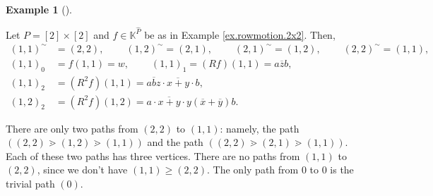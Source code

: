 \documentclass[numbers=enddot,12pt,final,onecolumn,notitlepage]{scrartcl}%
\theoremstyle{definition}
\newtheorem{exam}[theo]{Example}
\newenvironment{example}[1][]
{\begin{exam}[#1]\begin{leftbar}}
{\end{leftbar}\end{exam}}
\begin{document}
\begin{example}
Let $P=\left[  2\right]  \times\left[  2\right]  $ and $f\in\mathbb{K}%
^{\widehat{P}}$ be as in Example \ref{ex.rowmotion.2x2}. Then,%
\begin{align*}
\left(  1,1\right)  ^{\sim}  &  =\left(  2,2\right)
,\ \ \ \ \ \ \ \ \ \ \left(  1,2\right)  ^{\sim}=\left(  2,1\right)
,\ \ \ \ \ \ \ \ \ \ \left(  2,1\right)  ^{\sim}=\left(  1,2\right)
,\ \ \ \ \ \ \ \ \ \ \left(  2,2\right)  ^{\sim}=\left(  1,1\right)  ,\\
\left(  1,1\right)  _{0}  &  =f\left(  1,1\right)
=w,\ \ \ \ \ \ \ \ \ \ \left(  1,1\right)  _{1}=\left(  Rf\right)  \left(
1,1\right)  =a\overline{z}b,\\
\left(  1,1\right)  _{2}  &  =\left(  R^{2}f\right)  \left(  1,1\right)
=a\overline{b}z\cdot\overline{x+y}\cdot b,\\
\left(  1,2\right)  _{2}  &  =\left(  R^{2}f\right)  \left(  1,2\right)
=a\cdot\overline{x+y}\cdot y\left(  \overline{x}+\overline{y}\right)  b.
\end{align*}


There are only two paths from $\left(  2,2\right)  $ to $\left(  1,1\right)
$: namely, the path $\left(  \left(  2,2\right)  \gtrdot\left(  1,2\right)
\gtrdot\left(  1,1\right)  \right)  $ and the path $\left(  \left(
2,2\right)  \gtrdot\left(  2,1\right)  \gtrdot\left(  1,1\right)  \right)  $.
Each of these two paths has three vertices. There are no paths from $\left(
1,1\right)  $ to $\left(  2,2\right)  $, since we don't have $\left(
1,1\right)  \geq\left(  2,2\right)  $. The only path from $0$ to $0$ is the
trivial path $\left(  0\right)  $.


\end{example}
\end{document}
